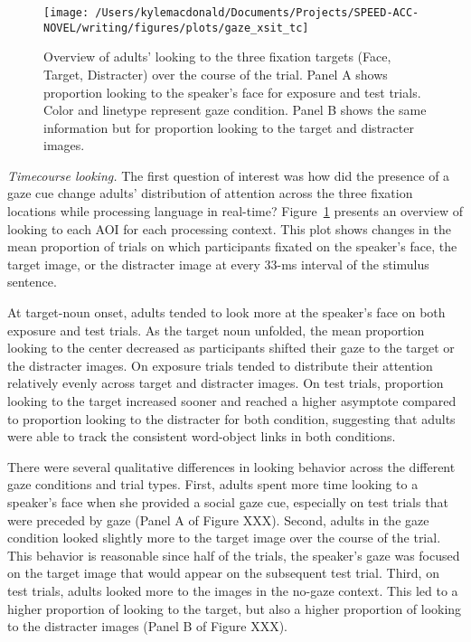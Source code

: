 \documentclass[man,floatsintext]{apa6}
\theoremstyle{definition}
\theoremstyle{definition}
\theoremstyle{definition}
\theoremstyle{remark}
\begin{document}
\begin{figure}[!t]

{\centering \texttt{[image: /Users/kylemacdonald/Documents/Projects/SPEED-ACC-NOVEL/writing/figures/plots/gaze\_xsit\_tc]} 

}

\caption{Overview of adults' looking to the three fixation targets (Face, Target, Distracter) over the course of the trial. Panel A shows proportion looking to the speaker's face for exposure and test trials. Color and linetype represent gaze condition. Panel B shows the same information but for proportion looking to the target and distracter images.}\label{fig:gaze-xsit-tc-plot}
\end{figure}

\emph{Timecourse looking.} The first question of interest was how did
the presence of a gaze cue change adults' distribution of attention
across the three fixation locations while processing language in
real-time? Figure~\ref{fig:gaze-xsit-tc-plot} presents an overview of
looking to each AOI for each processing context. This plot shows changes
in the mean proportion of trials on which participants fixated on the
speaker's face, the target image, or the distracter image at every 33-ms
interval of the stimulus sentence.

At target-noun onset, adults tended to look more at the speaker's face
on both exposure and test trials. As the target noun unfolded, the mean
proportion looking to the center decreased as participants shifted their
gaze to the target or the distracter images. On exposure trials tended
to distribute their attention relatively evenly across target and
distracter images. On test trials, proportion looking to the target
increased sooner and reached a higher asymptote compared to proportion
looking to the distracter for both condition, suggesting that adults
were able to track the consistent word-object links in both conditions.

There were several qualitative differences in looking behavior across
the different gaze conditions and trial types. First, adults spent more
time looking to a speaker's face when she provided a social gaze cue,
especially on test trials that were preceded by gaze (Panel A of Figure
XXX). Second, adults in the gaze condition looked slightly more to the
target image over the course of the trial. This behavior is reasonable
since half of the trials, the speaker's gaze was focused on the target
image that would appear on the subsequent test trial. Third, on test
trials, adults looked more to the images in the no-gaze context. This
led to a higher proportion of looking to the target, but also a higher
proportion of looking to the distracter images (Panel B of Figure XXX).
\end{document}
